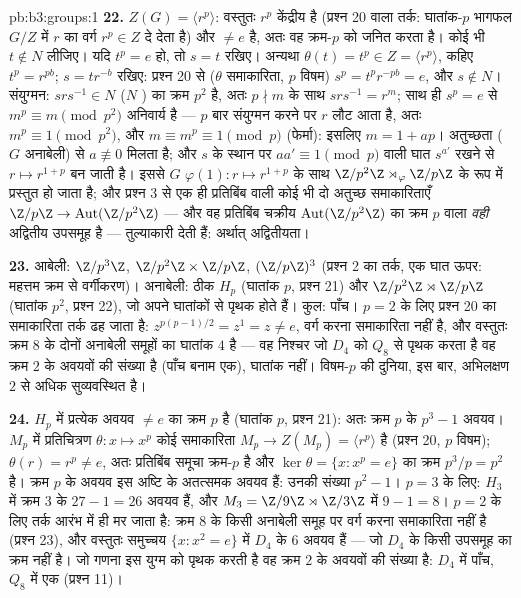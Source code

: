 \begin{solution}{pb:b3:groups:1}
\textbf{22.} $Z(G) = \langle r^p\rangle$: वस्तुतः $r^p$ केंद्रीय है (प्रश्न 20 वाला तर्क:
घातांक-$p$ भागफल $G/Z$ में $r$ का वर्ग $r^p \in Z$ दे देता है) और
$\neq e$ है, अतः वह क्रम-$p$  को जनित करता है। कोई भी $t \notin N$
लीजिए। यदि $t^p = e$ हो, तो $s = t$ रखिए। अन्यथा $\theta(t) = t^p \in Z =
\langle r^p\rangle$, कहिए $t^p = r^{pb}$; $s = tr^{-b}$
रखिए: प्रश्न 20 से ($\theta$ समाकारिता, $p$ विषम) $s^p =
t^pr^{-pb} = e$, और $s \notin N$।
संयुग्मन: $srs^{-1} \in
N$ ($N$ ) का क्रम $p^2$ है, अतः $p
\nmid m$ के
साथ $srs^{-1} = r^m$; साथ ही $s^p = e$ से $m^p \equiv m \pmod{p^2}$ अनिवार्य है --- $p$ बार संयुग्मन
करने पर $r$ लौट आता है, अतः $m^p \equiv 1 \pmod
{p^2}$, और $m \equiv m^p \equiv 1 \pmod p$ (फेर्मा): इसलिए
$m = 1 +
ap$। अतुच्छता ($G$ अनाबेली) से $a \not\equiv 0$ मिलता है; और $s$ के स्थान
पर $aa' \equiv 1 \pmod p$ वाली घात $s^{a'}$ रखने से  $r \mapsto r^{1+p}$ बन जाती है। इससे $G$
$\varphi(1)\colon r
\mapsto r^{1+p}$ के साथ $\Z/p^2\Z\rtimes_\varphi\Z/p\Z$ के रूप में प्रस्तुत हो जाता है; और प्रश्न 3 से
एक ही प्रतिबिंब वाली कोई भी दो अतुच्छ समाकारिताएँ $\Z/p\Z \to \operatorname{Aut}(\Z/p^2\Z)$ --- और वह
प्रतिबिंब चक्रीय $\operatorname{Aut}(\Z/p^2\Z)$ का क्रम $p$ वाला \emph{वही} अद्वितीय उपसमूह
है --- तुल्याकारी  देती हैं: अर्थात् अद्वितीयता।

\textbf{23.} आबेली: $\Z/p^3\Z$, $\Z/p^2\Z\times\Z/p\Z$, $(\Z/p\Z)^3$ (प्रश्न 2 का तर्क, एक घात
ऊपर: महत्तम क्रम से वर्गीकरण)। अनाबेली: ठीक $H_p$ (घातांक $p$,
प्रश्न 21) और $\Z/p^2\Z\rtimes\Z/p\Z$ (घातांक $p^2$, प्रश्न 22), जो अपने घातांकों से
पृथक होते हैं। कुल: पाँच। $p = 2$ के लिए प्रश्न 20 का समाकारिता तर्क
ढह जाता है: $z^{p(p-1)/2} = z^{1} = z \neq e$, वर्ग करना समाकारिता नहीं है, और वस्तुतः क्रम
$8$ के दोनों अनाबेली समूहों का घातांक $4$ है --- वह निश्चर जो
$D_4$ को $Q_8$ से पृथक करता है वह क्रम $2$ के अवयवों की संख्या है
(पाँच बनाम एक), घातांक नहीं। विषम-$p$ की दुनिया, इस बार, अभिलक्षण
$2$ से अधिक सुव्यवस्थित है।

\textbf{24.} $H_p$ में प्रत्येक अवयव $\neq e$ का क्रम $p$ है (घातांक
$p$, प्रश्न 21): अतः क्रम $p$ के $p^3 - 1$ अवयव। $M_p$ में
प्रतिचित्रण $\theta \colon x \mapsto x^p$ कोई समाकारिता $M_p \to Z(M_p) = \langle r^p\rangle$ है (प्रश्न 20, $p$ विषम);
$\theta(r) = r^p \neq e$, अतः प्रतिबिंब समूचा क्रम-$p$  है और $\ker\theta = \{x : x^p = e\}$ का क्रम
$p^3/p =
p^2$ है। क्रम $p$ के अवयव इस अष्टि के अतत्समक अवयव हैं: उनकी
संख्या $p^2 - 1$। $p = 3$ के लिए: $H_3$ में क्रम $3$ के $27 - 1 = 26$ अवयव हैं,
और $M_3 = \Z/9\Z \rtimes
\Z/3\Z$ में $9 - 1 = 8$। $p = 2$ के लिए तर्क आरंभ में ही मर जाता है: क्रम
$8$ के किसी अनाबेली समूह पर वर्ग करना समाकारिता नहीं है (प्रश्न
23), और वस्तुतः समुच्चय $\{x : x^2 = e\}$ में $D_4$ के $6$ अवयव हैं --- जो
$D_4$ के किसी उपसमूह का क्रम नहीं है। जो गणना इस युग्म को पृथक करती
है वह क्रम $2$ के अवयवों की संख्या है: $D_4$ में पाँच, $Q_8$ में
एक (प्रश्न 11)।


\end{solution}

